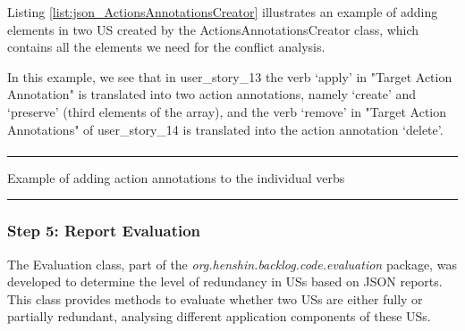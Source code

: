 \begin{example}
Listing \ref{list:json_ActionsAnnotationsCreator} illustrates an example of adding elements in two US created by the ActionsAnnotationsCreator class, which contains all the elements we need for the conflict analysis.

In this example, we see that in user\_story\_13 the verb ‘apply’ in "Target Action Annotation" is translated into two action annotations, namely ‘create’ and ‘preserve’ (third elements of the array), and the verb ‘remove’ in "Target Action Annotations" of user\_story\_14 is translated into the action annotation ‘delete’.
\end{example}

\begin{MyListing}
	\paragraph{}
	\hrule
	\centering
	
	\caption{Example of adding action annotations to the individual verbs}\label{list:json_ActionsAnnotationsCreator}
	\hrule
\end{MyListing}
\subsubsection*{Step 5: Report Evaluation}
The Evaluation class, part of the \textit{org.henshin.backlog.code.evaluation} package, was developed to determine the level of redundancy in USs based on JSON reports. This class provides methods to evaluate whether two USs are either fully or partially redundant, analysing different application components of these USs.

